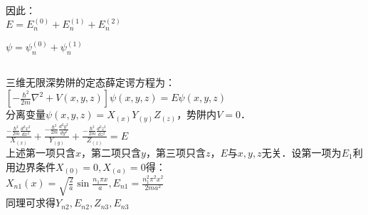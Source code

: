 因此：\\

$E = E^{(0)}_{n} + E^{(1)}_{n} + E^{(2)}_{n} $

$\psi = \psi^{(0)}_{n} + \psi^{(1)}_{n} $

\subsection{ }
三维无限深势阱的定态薛定谔方程为：\\

$\left[ -\frac{\hbar^{2}}{2m} \nabla^{2} +V(x,y,z) \right]\psi(x,y,z) = E\psi(x,y,z)$ \\

分离变量$\psi(x,y,z) = X_(x)Y_(y)Z_(z) $，势阱内$V=0$．\\

$\displaystyle \frac{-\frac{\hbar^{2}}{2m}\frac{d^{2} {x}^{2}}{d{x^{2}}}}{X_(x)} + \frac{-\frac{\hbar^{2}}{2m}\frac{d^{2} {y}^{2}}{d{y^{2}}}}{Y_(y)} + \frac{-\frac{\hbar^{2}}{2m}\frac{d^{2} {z}^{2}}{d{z^{2}}}}{Z_(z)} = E$ \\

上述第一项只含$x$，第二项只含$y$，第三项只含$z$，$E$与$x,y,z$无关．设第一项为$E_1$利用边界条件$X_{(0)} = 0,X_{(a)} = 0$得：\\

$\displaystyle X_{n1}(x) = \sqrt{\frac{2}{a}} \sin{\frac{n_{1} \pi x}{a}},E_{n1} = \frac{n^2_1 \pi^2 x^2}{2ma^2} $ \\

同理可求得$Y_{n2},E_{n2},Z_{n3},E_{n3} $